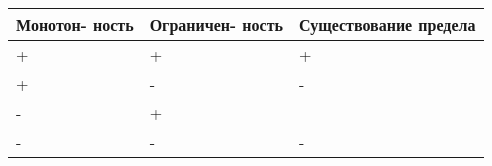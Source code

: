 \documentclass{article}
\begin{document}
\renewcommand\tabularxcolumn[1]{m{#1}}
\begin{center}
  \begin{tabularx}{0.7\textwidth} { 
  | X | X | X | }
 \hline
 Монотон-
 ность & Ограничен-
 ность & Существование
 предела\\
 \hline
 + &  +  & + \\
 \hline
 + & - & - \\
 \hline
 
 - & + & \\
 \hline
 - & - & - \\
 \hline

\end{tabularx}
\end{center}                 
\end{document}
